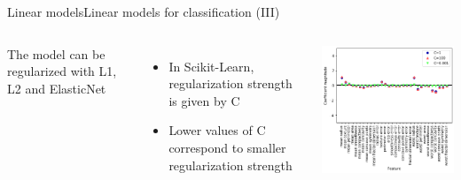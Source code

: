 \documentclass[10pt,compress]{beamer} %
\begin{document}
\begin{frame}{Linear models}{Linear models for classification (III)}
    \begin{columns}
        The model can be regularized with L1, L2 and ElasticNet
        \begin{itemize}
            \item In Scikit-Learn, regularization strength is given by C
            \item Lower values of C correspond to smaller regularization strength
        \end{itemize}

        \centering \includegraphics[width=\linewidth]{figs/logistic-c.png}
    \end{columns}
\end{frame}
\end{document}
